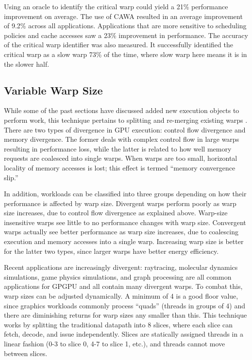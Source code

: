 \documentclass[prodmode,acmtecs]{acmsmall} %
\begin{document}
Using an oracle to identify the critical warp could yield a 21\% performance
improvement on average. The use of CAWA resulted in an average improvement of
9.2\% across all applications. Applications that are more sensitive to
scheduling policies and cache accesses saw a 23\% improvement in performance.
The accuracy of the critical warp identifier was also measured. It successfully
identified the critical warp as a slow warp 73\% of the time, where slow warp
here means it is in the slower half.

\subsection{Variable Warp Size}
While some of the past sections have discussed added new execution objects to
perform work, this technique pertains to splitting and re-merging existing warps
\cite{VariableWarpSize}. There are two types of divergence in GPU execution:
control flow divergence and memory divergence. The former deals with complex
control flow in large warps resulting in performance loss, while the latter is
related to how well memory requests are coalesced into single warps. When warps
are too small, horizontal locality of memory accesses is lost; this effect is
termed ``memory convergence slip.''

In addition, workloads can be classified into three groups depending on how
their performance is affected by warp size. Divergent warps perform poorly as
warp size increases, due to control flow divergence as explained above.
Warp-size insensitive warps see little to no performance changes with warp size.
Convergent warps actually see better performance as warp size increases, due to
coalescing execution and memory accesses into a single warp. Increasing warp
size is better for the latter two types, since larger warps have better energy
efficiency.

Recent applications are increasingly divergent: raytracing, molecular dynamics
simulations, game physics simulations, and graph processing are all common
applications for GPGPU and all contain many divergent warps. To combat this,
warp sizes can be adjusted dynamically. A minimum of 4 is a good floor value,
since graphics workloads commonly process ``quads'' (threads in groups of 4) and
there are diminishing returns for warp sizes any smaller than this. This
technique works by splitting the traditional datapath into 8 slices, where each
slice can fetch, decode, and issue independently. Slices are statically assigned
threads in a linear fashion (0-3 to slice 0, 4-7 to slice 1, etc.), and threads
cannot move between slices.
\end{document}
